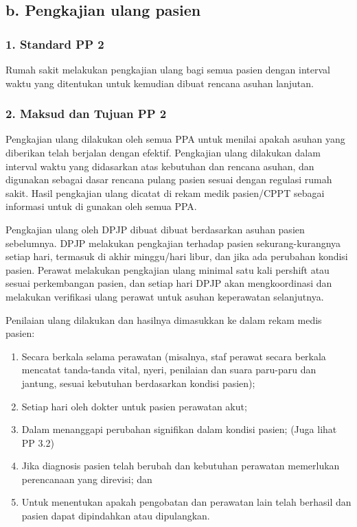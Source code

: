 \documentclass[
]{book}
\providecommand{\tightlist}{%
  \setlength{\itemsep}{0pt}\setlength{\parskip}{0pt}}
\begin{document}
\hypertarget{b.-pengkajian-ulang-pasien}{%
\subsection*{b. Pengkajian ulang pasien}\label{b.-pengkajian-ulang-pasien}}

\hypertarget{standard-pp-2}{%
\subsubsection*{1. Standard PP 2}\label{standard-pp-2}}

Rumah sakit melakukan pengkajian ulang bagi semua pasien dengan interval waktu yang ditentukan untuk kemudian dibuat rencana asuhan lanjutan.

\hypertarget{maksud-dan-tujuan-pp-2}{%
\subsubsection*{2. Maksud dan Tujuan PP 2}\label{maksud-dan-tujuan-pp-2}}

Pengkajian ulang dilakukan oleh semua PPA untuk menilai apakah asuhan yang diberikan telah berjalan dengan efektif. Pengkajian ulang dilakukan dalam interval waktu yang didasarkan atas kebutuhan dan rencana asuhan, dan digunakan sebagai dasar rencana pulang pasien sesuai dengan regulasi rumah sakit. Hasil pengkajian ulang dicatat di rekam medik pasien/CPPT sebagai informasi untuk di gunakan oleh semua PPA.

Pengkajian ulang oleh DPJP dibuat dibuat berdasarkan asuhan pasien sebelumnya. DPJP melakukan pengkajian terhadap pasien sekurang-kurangnya setiap hari, termasuk di akhir minggu/hari libur, dan jika ada perubahan kondisi pasien. Perawat melakukan pengkajian ulang minimal satu kali pershift atau sesuai perkembangan pasien, dan setiap hari DPJP akan mengkoordinasi dan melakukan verifikasi ulang perawat untuk asuhan keperawatan selanjutnya.

Penilaian ulang dilakukan dan hasilnya dimasukkan ke dalam rekam medis pasien:

\begin{enumerate}
\def\labelenumi{\alph{enumi}.}
\tightlist
\item
  Secara berkala selama perawatan (misalnya, staf perawat secara berkala mencatat tanda-tanda vital, nyeri, penilaian dan suara paru-paru dan jantung, sesuai kebutuhan berdasarkan kondisi pasien);
\item
  Setiap hari oleh dokter untuk pasien perawatan akut;
\item
  Dalam menanggapi perubahan signifikan dalam kondisi pasien; (Juga lihat PP 3.2)
\item
  Jika diagnosis pasien telah berubah dan kebutuhan perawatan memerlukan perencanaan yang direvisi; dan
\item
  Untuk menentukan apakah pengobatan dan perawatan lain telah berhasil dan pasien dapat dipindahkan atau dipulangkan.
\end{enumerate}
\end{document}
